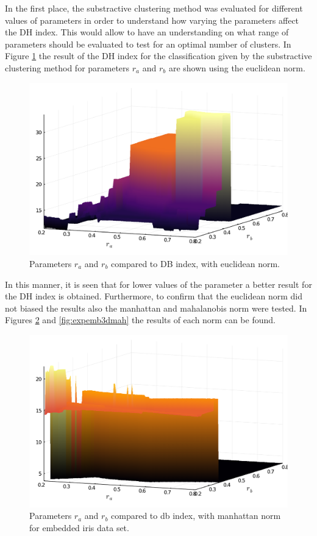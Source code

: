 \documentclass[conference]{IEEEtran}
\theoremstyle{definition}
\theoremstyle{remark}
\theoremstyle{remark}
\begin{document}
In the first place, the substractive clustering method was evaluated for
different values of parameters in order to understand how varying the parameters
affect the DH index. This would allow to have an understanding on what range of
parameters should be evaluated to test for an optimal number of clusters. In
Figure \ref{fig:expemb3d} the result of the DH index for the classification
given by the substractive clustering method for parameters $r_{a}$ and $r_{b}$
are shown using the euclidean norm.

\begin{figure}[t]
  \centering
  \includegraphics[scale=.35]{figs/iris/exploring-3d-emb}
  \caption{Parameters $r_{a}$ and $r_{b}$ compared to DB index, with euclidean
    norm.}
  \label{fig:expemb3d}
\end{figure}

In this manner, it is seen that for lower values of the parameter a better
result for the DH index is obtained. Furthermore, to confirm that the euclidean
norm did not biased the results also the manhattan and mahalanobis norm were
tested. In Figures \ref{fig:expemb3dman} and \ref{fig:expemb3dmah} the results
of each norm can be found.

\begin{figure}[t]
  \centering
  \includegraphics[scale=.35]{figs/iris/exploring-3d-emb-man}
  \caption{Parameters $r_{a}$ and $r_{b}$ compared to db index, with manhattan
    norm for embedded iris data set.}
  \label{fig:expemb3dman}
\end{figure}
\end{document}
